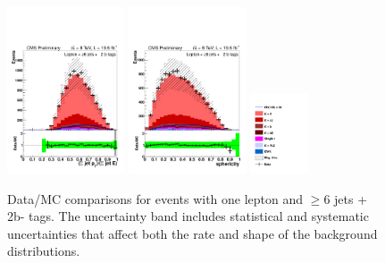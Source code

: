 \begin{figure}[hbtp]
\begin{center}
   \includegraphics[width=0.31\textwidth]{Figures/Analysis_2_Diagrams/LJ_plots_lep/6j2t/lep_pt_all_jets_over_E_all_jets_6j2t_cumulative_wRatio_noLegend_lin.pdf}
   \includegraphics[width=0.31\textwidth]{Figures/Analysis_2_Diagrams/LJ_plots_lep/6j2t/lep_sphericity_6j2t_cumulative_wRatio_noLegend_lin.pdf}
   \includegraphics[width=0.15\textwidth]{Figures/Analysis_2_Diagrams/LJ_plots_lep/ttH_legend_1columns.pdf}
   \caption{Data/MC comparisons for events with one lepton and $\ge$6 jets + 2b- tags.  The uncertainty band includes statistical and systematic uncertainties that affect both the rate and shape of the background distributions.}
   \label{fig:lj_input_II_6j2t}
 \end{center}
\end{figure}

\clearpage


